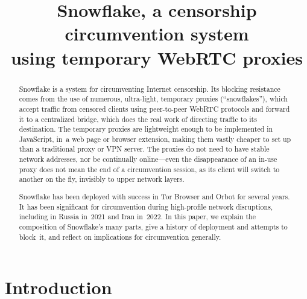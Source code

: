 \documentclass[letterpaper,twocolumn]{article}
\begin{document}
\date{}

\title{\Large\bf Snowflake, a censorship circumvention system\\using temporary WebRTC proxies}


\maketitle

\begin{abstract}
Snowflake is a system for circumventing Internet censorship.
Its blocking resistance comes from
the use of numerous, ultra-light, temporary proxies (``snowflakes''),
which accept traffic from censored clients using peer-to-peer WebRTC protocols
and forward it to a centralized bridge,
which does the real work of directing traffic to its destination.
The temporary proxies are lightweight enough to be implemented in JavaScript,
in~a web page or browser extension,
making them vastly cheaper to set up than
a traditional proxy or VPN server.
The proxies do not need to have stable network addresses,
nor be continually online---even
the disappearance of an \mbox{in-use} proxy
does not mean the end of a circumvention session,
as its client will switch to another on the fly,
invisibly to upper network layers.


Snowflake has been deployed with success
in Tor Browser and Orbot for several years.
It has been significant for circumvention
during high-profile network disruptions,
including in Russia in~2021 and Iran in~2022.
In this paper, we explain the composition of Snowflake's many parts,
give a history of deployment and attempts to block~it,
and reflect on implications for circumvention generally.
\end{abstract}


\section{Introduction}
\label{sec:intro}
\end{document}
